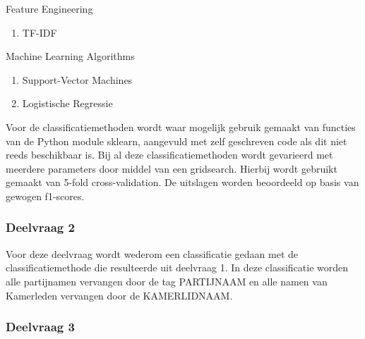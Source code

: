 Feature Engineering
\begin{enumerate}
\item TF-IDF
\end{enumerate} 

Machine Learning Algorithms
\begin{enumerate}
\item Support-Vector Machines
\item Logistische Regressie
\end{enumerate}

Voor de classificatiemethoden wordt waar mogelijk gebruik gemaakt van functies van de Python module sklearn, aangevuld met zelf geschreven code als dit niet reeds beschikbaar is. Bij al deze classificatiemethoden wordt gevarieerd met meerdere parameters door middel van een gridsearch. Hierbij wordt gebruikt gemaakt van 5-fold cross-validation. De uitslagen worden beoordeeld op basis van gewogen f1-scores. 

\subsubsection{Deelvraag 2}

Voor deze deelvraag wordt wederom een classificatie gedaan met de classificatiemethode die resulteerde uit deelvraag 1. In deze classificatie worden alle partijnamen vervangen door de tag PARTIJNAAM en alle namen van Kamerleden vervangen door de KAMERLIDNAAM. 
\subsubsection{Deelvraag 3}

